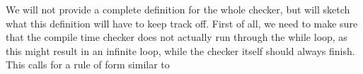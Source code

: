 We will not provide a complete definition for the whole checker, but will sketch what this definition will have to keep track off. 
First of all, we need to make sure that the compile time checker does not actually run through the while loop, as this might result in an infinite loop, while the checker itself should always finish. This calls for a rule of form similar to

